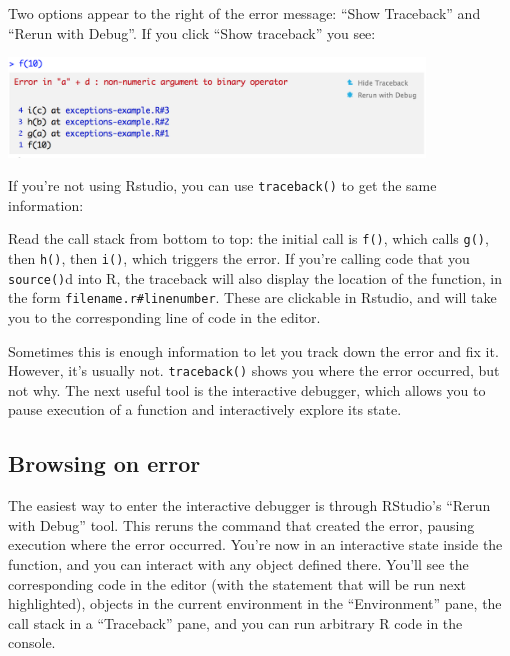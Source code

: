 Two options appear to the right of the error message: ``Show Traceback''
and ``Rerun with Debug''. If you click ``Show traceback'' you see:

\includegraphics[width=4.35in]{screenshots/traceback-shown.png}

If you're not using Rstudio, you can use \texttt{traceback()} to get the
same information:

\begin{Shaded}
\begin{Highlighting}[]
\NormalTok{()}
\end{Highlighting}
\end{Shaded}

Read the call stack from bottom to top: the initial call is
\texttt{f()}, which calls \texttt{g()}, then \texttt{h()}, then
\texttt{i()}, which triggers the error. If you're calling code that you
\texttt{source()}d into R, the traceback will also display the location
of the function, in the form \texttt{filename.r\#linenumber}. These are
clickable in Rstudio, and will take you to the corresponding line of
code in the editor.

Sometimes this is enough information to let you track down the error and
fix it. However, it's usually not. \texttt{traceback()} shows you where
the error occurred, but not why. The next useful tool is the interactive
debugger, which allows you to pause execution of a function and
interactively explore its state.

\subsection{Browsing on error}

The easiest way to enter the interactive debugger is through RStudio's
``Rerun with Debug'' tool. This reruns the command that created the
error, pausing execution where the error occurred. You're now in an
interactive state inside the function, and you can interact with any
object defined there. You'll see the corresponding code in the editor
(with the statement that will be run next highlighted), objects in the
current environment in the ``Environment'' pane, the call stack in a
``Traceback'' pane, and you can run arbitrary R code in the console.

